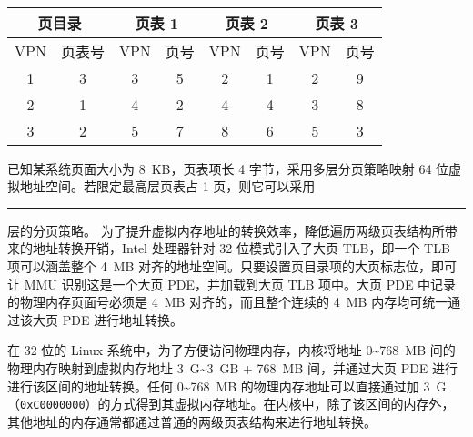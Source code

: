 \begin{problems}
        \begin{table}[H]
            \tt
            \centering
            \begin{tabular}{|cc|cc|cc|cc|}
                \hline
                \multicolumn{2}{|c|}{页目录} & \multicolumn{2}{c|}{页表 1} & \multicolumn{2}{c|}{页表 2} & \multicolumn{2}{c|}{页表 3} \\ \hline
                \multicolumn{1}{|c|}{VPN} & 页表号 & \multicolumn{1}{c|}{VPN} & 页号 & \multicolumn{1}{c|}{VPN} & 页号 & \multicolumn{1}{c|}{VPN} & 页号 \\ \hline
                \multicolumn{1}{|c|}{1} & 3 & \multicolumn{1}{c|}{3} & 5 & \multicolumn{1}{c|}{2} & 1 & \multicolumn{1}{c|}{2} & 9 \\ \hline
                \multicolumn{1}{|c|}{2} & 1 & \multicolumn{1}{c|}{4} & 2 & \multicolumn{1}{c|}{4} & 4 & \multicolumn{1}{c|}{3} & 8 \\ \hline
                \multicolumn{1}{|c|}{3} & 2 & \multicolumn{1}{c|}{5} & 7 & \multicolumn{1}{c|}{8} & 6 & \multicolumn{1}{c|}{5} & 3 \\ \hline
            \end{tabular}
        \end{table}
         已知某系统页面大小为 \SI{8}{KB}，页表项长 4 字节，采用多层分页策略映射 64 位虚拟地址空间。若限定最高层页表占 1 页，则它可以采用\rule{2.5cm}{0.25mm} 层的分页策略。
         为了提升虚拟内存地址的转换效率，降低遍历两级页表结构所带来的地址转换开销，Intel 处理器针对 32 位模式引入了大页 TLB，即一个 TLB 项可以涵盖整个 \SI{4}{MB} 对齐的地址空间。只要设置页目录项的大页标志位，即可让 MMU 识别这是一个大页 PDE，并加载到大页 TLB 项中。大页 PDE 中记录的物理内存页面号必须是 \SI{4}{MB} 对齐的，而且整个连续的 \SI{4}{MB} 内存均可统一通过该大页 PDE 进行地址转换。
        
        在 32 位的 Linux 系统中，为了方便访问物理内存，内核将地址 0\textasciitilde\SI{768}{MB} 间的物理内存映射到虚拟内存地址 \SI{3}{G}\textasciitilde\SI{3}{GB} + \SI{768}{MB} 间，并通过大页 PDE 进行进行该区间的地址转换。任何 0\textasciitilde\SI{768}{MB} 的物理内存地址可以直接通过加 \SI{3}{G}（\verb|0xC0000000|）的方式得到其虚拟内存地址。在内核中，除了该区间的内存外，其他地址的内存通常都通过普通的两级页表结构来进行地址转换。
        

\end{problems}
